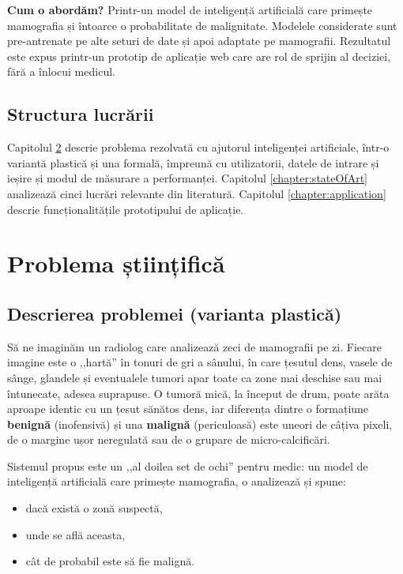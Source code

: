 \documentclass[runningheads,a4paper,11pt]{report}
\begin{document}
\textbf{Cum o abordăm?} Printr-un model de inteligență artificială care primește mamografia și întoarce o probabilitate de malignitate. Modelele considerate sunt pre-antrenate pe alte seturi de date și apoi adaptate pe mamografii. Rezultatul este expus printr-un prototip de aplicație web care are rol de sprijin al deciziei, fără a înlocui medicul.

\section{Structura lucrării}
\label{section:structure}

Capitolul \ref{section:scientificProblem} descrie problema rezolvată cu ajutorul inteligenței artificiale, într-o variantă plastică și una formală, împreună cu utilizatorii, datele de intrare și ieșire și modul de măsurare a performanței. Capitolul \ref{chapter:stateOfArt} analizează cinci lucrări relevante din literatură. Capitolul \ref{chapter:application} descrie funcționalitățile prototipului de aplicație.


\chapter{Problema științifică}
\label{section:scientificProblem}

\section{Descrierea problemei (varianta plastică)}
\label{section:problemDefinition}

Să ne imaginăm un radiolog care analizează zeci de mamografii pe zi. Fiecare imagine este o ,,hartă'' în tonuri de gri a sânului, în care țesutul dens, vasele de sânge, glandele și eventualele tumori apar toate ca zone mai deschise sau mai întunecate, adesea suprapuse. O tumoră mică, la început de drum, poate arăta aproape identic cu un țesut sănătos dens, iar diferența dintre o formațiune \textbf{benignă} (inofensivă) și una \textbf{malignă} (periculoasă) este uneori de câțiva pixeli, de o margine ușor neregulată sau de o grupare de micro-calcificări.

Sistemul propus este un ,,al doilea set de ochi'' pentru medic: un model de inteligență artificială care primește mamografia, o analizează și spune:
\begin{itemize}
	\item dacă există o zonă suspectă,
	\item unde se află aceasta,
	\item cât de probabil este să fie malignă.
\end{itemize}
\end{document}

